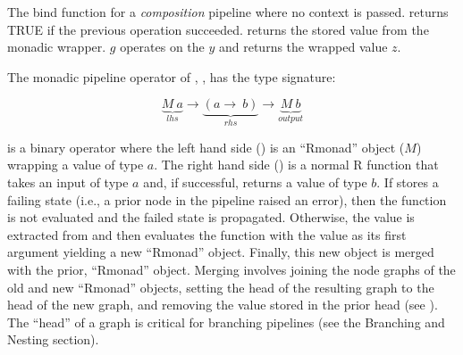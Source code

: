 \begin{algorithm}
  \DontPrintSemicolon
  \caption{The bind function for a \emph{composition} pipeline where no context is passed.  returns TRUE if the previous operation succeeded.  returns the stored value from the monadic wrapper. $g$ operates on the $y$ and returns the wrapped value $z$.}
\label{alg:bind-comp}
\end{algorithm}


The monadic pipeline operator of , \code{\%>{}>\%}, has the type signature:

\begin{equation}
  \underbrace{M\ a}_{lhs} \rightarrow \underbrace{(a \rightarrow \ b)}_{rhs} \rightarrow \underbrace{M\ b}_{output}
\end{equation}

\noindent
\code{\%>{}>\%} is a binary operator where the left hand side () is an
``Rmonad'' object ($M$) wrapping a value of type $a$. The right hand side
() is a normal R function that takes an input of type $a$ and, if
successful, returns a value of type $b$. If  stores a failing state
(i.e., a prior node in the pipeline raised an error), then the 
function is not evaluated and the failed state is propagated. Otherwise, the
value is extracted from  and  then evaluates the
 function with the  value as its first argument yielding a
new ``Rmonad'' object. Finally, this new object is merged with the prior,
 ``Rmonad'' object.  Merging involves joining the node graphs of the
old and new ``Rmonad'' objects, setting the head of the resulting graph to the
head of the new graph, and removing the value stored in the prior head  (see
). The ``head'' of a graph is critical  for branching pipelines
(see the Branching and Nesting section).

